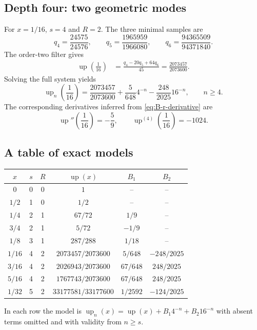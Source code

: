 \documentclass[11pt]{article}
\theoremstyle{definition}
\theoremstyle{remark}
\newcommand{\rv}{\operatorname{up}}
\begin{document}
\subsection{Depth four: two geometric modes}

For \(x=1/16\), \(s=4\) and \(R=2\).  The three minimal samples are
\begin{equation}
 q_4=\frac{24575}{24576},\qquad
 q_5=\frac{1965959}{1966080},\qquad
 q_6=\frac{94365509}{94371840}.
 \label{eq:x-sixteenth-samples}
\end{equation}
The order-two filter gives
\begin{align}
 \rv\!\left(\frac1{16}\right)
 &=\frac{q_4-20q_5+64q_6}{45}
 =\frac{2073457}{2073600}.
 \label{eq:x-sixteenth-limit}
\end{align}
Solving the full system yields
\begin{equation}
 \boxed{
 \rv_n\!\left(\frac1{16}\right)
 =\frac{2073457}{2073600}
 +\frac{5}{648}4^{-n}
 -\frac{248}{2025}16^{-n},
 \qquad n\ge4.}
 \label{eq:x-sixteenth-model}
\end{equation}
The corresponding derivatives inferred from
\cref{eq:B-r-derivative} are
\begin{equation}
 \rv''\!\left(\frac1{16}\right)=-\frac59,
 \qquad
 \rv^{(4)}\!\left(\frac1{16}\right)=-1024.
 \label{eq:x-sixteenth-derivatives}
\end{equation}

\subsection{A table of exact models}

\begin{center}
\small
\setlength{\tabcolsep}{4pt}
\begin{tabular}{@{}c c c c c c@{}}
\toprule
\(x\) & \(s\) & \(R\) & \(\rv(x)\) & \(B_1\) & \(B_2\) \\
\midrule
\(0\) & 0 & 0 & \(1\) & -- & -- \\
\(1/2\) & 1 & 0 & \(1/2\) & -- & -- \\
\(1/4\) & 2 & 1 & \(67/72\) & \(1/9\) & -- \\
\(3/4\) & 2 & 1 & \(5/72\) & \(-1/9\) & -- \\
\(1/8\) & 3 & 1 & \(287/288\) & \(1/18\) & -- \\
\(1/16\) & 4 & 2 & \(2073457/2073600\) & \(5/648\) & \(-248/2025\) \\
\(3/16\) & 4 & 2 & \(2026943/2073600\) & \(67/648\) & \(248/2025\) \\
\(5/16\) & 4 & 2 & \(1767743/2073600\) & \(67/648\) & \(248/2025\) \\
\(1/32\) & 5 & 2 & \(33177581/33177600\) & \(1/2592\) & \(-124/2025\) \\
\bottomrule
\end{tabular}
\end{center}
In each row the model is
\(
 \rv_n(x)=\rv(x)+B_1 4^{-n}+B_2 16^{-n}
\)
with absent terms omitted and with validity from \(n\ge s\).
\end{document}
